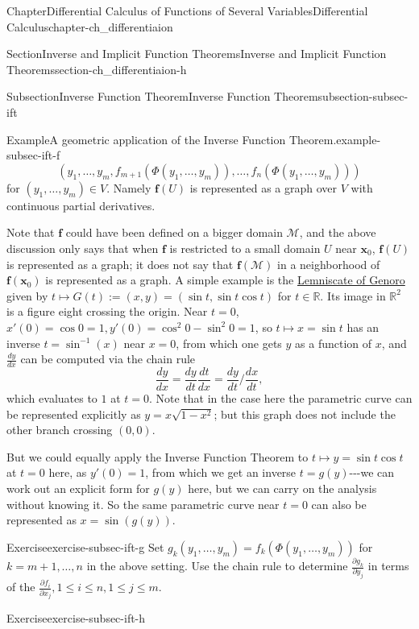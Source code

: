 \documentclass[oneside,10pt,]{book}
\numberwithin{equation}{section}
\newcommand{\bff}{\mathbf{f}}
\newcommand{\bx}{\mathbf{x}}
\newcommand{\bbR}{\mathbb{R}}
\newcommand{\cM}{\mathcal{M}}
\begin{document}
\begin{chapterptx}{Chapter}{Differential Calculus of Functions of Several Variables}{}{Differential Calculus}{}{}{chapter-ch_differentiaion}
\begin{sectionptx}{Section}{Inverse and Implicit Function Theorems}{}{Inverse and Implicit Function Theorems}{}{}{section-ch_differentiaion-h}
\begin{subsectionptx}{Subsection}{Inverse Function Theorem}{}{Inverse Function Theorem}{}{}{subsection-subsec-ift}
\begin{example}{Example}{A geometric application of the Inverse Function Theorem.}{example-subsec-ift-f}
\begin{equation*}
(y_{1},\ldots, y_{m}, f_{m+1}(\Phi(y_{1},\ldots, y_{m})), \ldots, f_{n}(\Phi(y_{1},\ldots, y_{m})))
\end{equation*}
for \((y_{1},\ldots, y_{m})\in V\). Namely \(\bff(U)\) is represented as a graph over \(V\) with continuous partial derivatives.%
\par
Note that \(\bff\) could have been defined on a bigger domain \(\cM\), and the above discussion only says that when \(\bff\) is restricted to a small domain \(U\) near \(\bx_{0}\), \(\bff(U)\) is represented as a graph; it does not say that \(\bff(\cM)\) in a neighborhood of \(\bff(\bx_{0})\) is represented as a graph. A simple example is the \href{https://www.desmos.com/calculator/skduzarzqh}{Lemniscate of Genoro}\footnotemark{} given by \(t\mapsto G(t):=(x, y)=(\sin t, \sin t \cos t)\) for \(t\in \bbR\). Its image in \(\bbR^{2}\) is a figure eight crossing the origin. Near \(t=0\), \(x'(0)=\cos 0=1, y'(0)=\cos^{2}0-\sin^{2}0=1\), so \(t\mapsto x=\sin t\) has an inverse \(t=\sin^{-1}(x)\) near \(x=0\), from which one gets \(y\) as a function of \(x\), and \(\frac{d y}{dx}\) can be computed via the chain rule%
\begin{equation*}
\frac{d y}{dx}=\frac{dy}{dt} \frac{dt}{dx}= \frac{dy}{dt}/ \frac{dx}{dt},
\end{equation*}
which evaluates to \(1\) at \(t=0\). Note that in the case here the parametric curve can be represented explicitly as \(y=x\sqrt{1-x^{2}}\); but this graph does not include the other branch crossing \((0, 0)\).%
\par
But we could equally apply the Inverse Function Theorem to \(t\mapsto y=\sin t \cos t\) at \(t=0\) here, as \(y'(0)=1\), from which we get an inverse \(t=g(y)\)-{}-{}-we can work out an explicit form for \(g(y)\) here, but we can carry on the analysis without knowing it.  So the same parametric curve near \(t=0\) can also be represented as \(x=\sin (g(y))\).%
\end{example}
%
\begin{inlineexercise}{Exercise}{}{exercise-subsec-ift-g}%
Set \(g_{k}(y_{1},\ldots, y_{m})=f_{k}(\Phi(y_{1},\ldots, y_{m}))\) for \(k=m+1,\ldots, n\) in the above setting. Use the chain rule to determine \(\frac{\partial g_k}{\partial y_j}\) in terms of the \(\frac{\partial f_i}{\partial x_j}, 1 \le i\le n, 1\le j \le m\).\end{inlineexercise}%
\begin{inlineexercise}{Exercise}{}{exercise-subsec-ift-h}%

\end{inlineexercise}
\end{subsectionptx}
\end{sectionptx}
\end{chapterptx}
\end{document}
